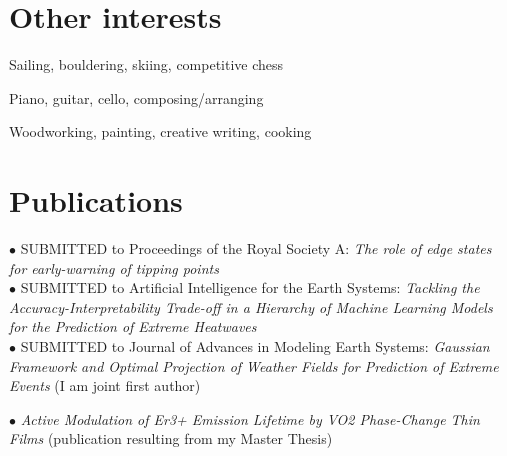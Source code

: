 \documentclass[11pt, a4 paper]{article}
\newcommand{\bu}{$\bullet$ }
\begin{document}
\section*{Other interests}
  \begin{description}[style=multiline,leftmargin=3cm,align=right]
    \item[Sports] Sailing, bouldering, skiing, competitive chess
    \item[Music] Piano, guitar, cello, composing/arranging
    \item[Other] Woodworking, painting, creative writing, cooking
  \end{description}

\section*{Publications}
  \begin{description}[style=multiline,leftmargin=3cm,align=right]
    \item[2024]
    \bu SUBMITTED to Proceedings of the Royal Society A: \emph{The role of edge states for early-warning of tipping points} \cite{lohmannRoleEdgeStates2024} \\
    \bu SUBMITTED to Artificial Intelligence for the Earth Systems: \emph{Tackling the Accuracy-Interpretability Trade-off in a Hierarchy of Machine Learning Models for the Prediction of Extreme Heatwaves} \cite{lovoTacklingAccuracyInterpretabilityTradeHierarchy2024} \\
    \bu SUBMITTED to Journal of Advances in Modeling Earth Systems: \emph{Gaussian Framework and Optimal Projection of Weather Fields for Prediction of Extreme Events} \cite{mascoloGaussianFrameworkOptimal2024} (I am joint first author)
    \item[2023]
    \bu \emph{Active Modulation of Er3+ Emission Lifetime by VO2 Phase-Change Thin Films} \cite{kalinicActiveModulationEr32024} (publication resulting from my Master Thesis)
  \end{description}
\end{document}
